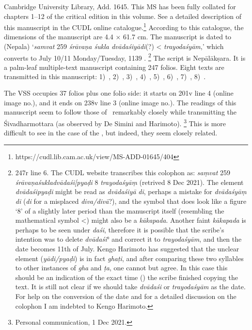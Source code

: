 Cambridge University Library, Add. 1645. This MS has been fully
collated for chapters 1--12 of the critical edition in this volume. 
See a detailed description of this manuscript in the CUDL online catalogue.\footnote{https://cudl.lib.cam.ac.uk/view/MS-ADD-01645/404}
According to this catalogue, the dimensions of the manuscript are 
4.4 × 61.7 cm. The manuscript is dated to (Nepala) `\emph{samvat} 259
\emph{śrāvaṇa śukla dvādaśiyādi}(?) \textless{} \emph{trayodaśyām},'
which converts to July 10/11 Monday/Tuesday, 1139 \CE.%
		 \footnote{\Fol247r line 6. The CUDL website transcribes this
		  colophon as: \emph{saṃvat} 259 
		  \emph{śrāvaṇaśukladvādaśi{\rm[}pyaḍi} 8 
		  \emph{trayodaśyāṃ} (retrived 8 Dec 2021). 
		  The element \emph{dvādaśipyaḍi} might be read as
		  \emph{dvādaśiyā} \emph{di}, perhaps a mistake for
		   \emph{dvādaśyāṃ}
		  \emph{di} (\emph{di} for a misplaced \emph{diva/divā}?), and the
		  symbol that does look like a figure `8' of a slightly later period
		  than the manuscript itself (resembling the mathematical symbol
		  \textless{}) might also be a \emph{kākapada}. Another faint
		  \emph{kākapada} is perhaps to be seen under \emph{daśi},
		  therefore it is possible that the scribe's intention was to delete 	
		  \emph{dvādaśi}° and correct it to \emph{trayodaśyām}, 
		  and then the date becomes 11th of July. Kengo Harimoto 
		  has suggested that the unclear element
		  (\emph{yādi/pyaḍi}) is in fact \emph{ghaṭi}, 
		  and after comparing these two syllables to other instances of
		   \emph{gha} and \emph{ṭa}, one cannot but agree. 
		   In this case this should be an indication of the
		  exact time () 
		  the scribe finished copying the text. It is still not clear
		  if we should take \emph{dvādaśi} or \emph{trayodaśyām} 
		  as the date. For help on the conversion of the date and 
		  for a detailed discussion on the colophon I am indebted
		  to Kengo Harimoto.} 
The script is Nepālā\-kṣara. It is a palm-leaf multiple-text manuscript containing 247 folios. Eight texts are transmitted in this manuscript: 
1)~\SDhS,
2)~\SDhU,
3)~\SDhSangr,
4)~\SivaUp,
5)~\Ums,
6)~\Uums, 
7)~\Vss,
8)~\DharmP.


The VSS occupies 37 folios plus one folio side: it starts on \fol201v
line 4 (online image no.), 
and it ends on \fol238v line 3 (online image
no.). 
The readings of this manuscript seem to follow those of \msNa\
remarkably closely while transmitting the 
Śivadharmottara (as observed by De Simini and Harimoto).%
\footnote{Personal communication, 1 Dec 2021.} This
is more difficult to see in the case of the \VSS, 
but indeed, they seem closely related. 


